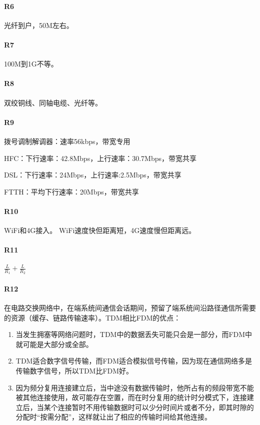 \paragraph*{R6}光纤到户，50M左右。

\paragraph*{R7}100M到1G不等。

\paragraph*{R8}双绞铜线、同轴电缆、光纤等。

\paragraph*{R9}
拨号调制解调器：速率56kbps，带宽专用

HFC：下行速率：42.8Mbps，上行速率：30.7Mbps，带宽共享

DSL：下行速率：24Mbps，上行速率:2.5Mbps，带宽共享

FTTH：平均下行速率：20Mbps，带宽共享

\paragraph*{R10}WiFi和4G接入。 WiFi速度快但距离短，4G速度慢但距离远。

\paragraph*{R11}$\frac{L}{R_1}+\frac{L}{R_2}$

\paragraph*{R12}
在电路交换网络中，在端系统间通信会话期间，预留了端系统间沿路径通信所需要的资源（缓存、链路传输速率）。TDM相比FDM的优点：
\begin{enumerate}
  \item 当发生拥塞等网络问题时，TDM中的数据丢失可能只会是一部分，而FDM中就可能是大部分或全部。
  \item TDM适合数字信号传输，而FDM适合模拟信号传输，因为现在通信网络多是传输数字信号，所以TDM比FDM好。
  \item 因为频分复用连接建立后，当中途没有数据传输时，他所占有的频段带宽不能被其他连接使用，故可能存在空置，而在时分复用的统计时分模式下，连接建立后，当某个连接暂时不用传输数据时可以少分时间片或者不分，即其时隙的分配时“按需分配”，这样就让出了相应的传输时间给其他连接。
\end{enumerate}

